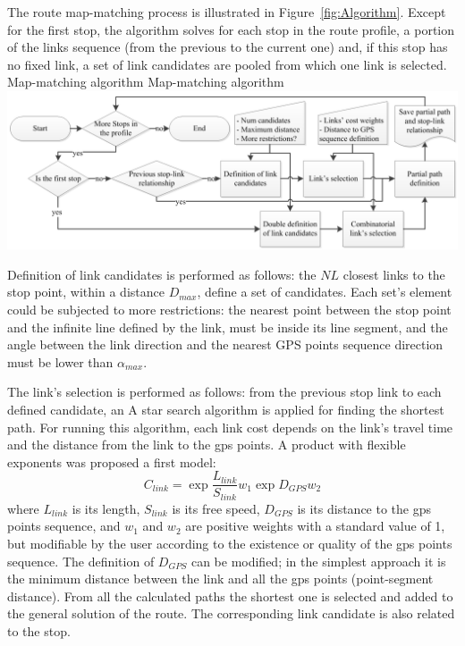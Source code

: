 The route map-matching process is illustrated in Figure~\ref{fig:Algorithm}. Except for the first stop, the algorithm solves for each stop in the route profile, a portion of the links sequence (from the previous to the current one) and, if this stop has no fixed link, a set of link candidates are pooled from which one link is selected.
%
\createfigure
{Map-matching algorithm}
{Map-matching algorithm}
{\label{fig:Algorithm}}
{\includegraphics[width=1.0\textwidth]{extending/figures/semiAuto/Algorithm.png}}
{}

Definition of link candidates is performed as follows: the $NL$ closest links to the stop point, within a distance $D_{max}$, define a set of candidates. Each set's element could be subjected to more restrictions: the nearest point between the stop point and the infinite line defined by the link, must be inside its line segment, and the angle between the link direction and the nearest GPS points sequence direction must be lower than $\alpha_{max}$.

The link's selection is performed as follows: from the previous stop link to each defined candidate, an A star search algorithm is applied for finding the shortest path. For running this algorithm, each link cost depends on the link's travel time and the distance from the link to the \gls{gps} points. A product with flexible exponents was proposed a first model:
%
\begin{equation}
\label{eq:LinkCost}
	C_{link} = \exp{\frac{L_{link}}{S_{link}}}{w_{1}}\exp{D_{GPS}}{w_{2}}
\end{equation}
%
where $L_{link}$ is its length, $S_{link}$ is its free speed, $D_{GPS}$ is its distance to the \gls{gps} points sequence, and $w_{1}$ and $w_{2}$ are positive weights with a standard value of 1, but modifiable by the user according to the existence or quality of the \gls{gps} points sequence. The definition of $D_{GPS}$ can be modified; in the simplest approach it is the minimum distance between the link and all the \gls{gps} points (point-segment distance). From all the calculated paths the shortest one is selected and added to the general solution of the route. The corresponding link candidate is also related to the stop. 

